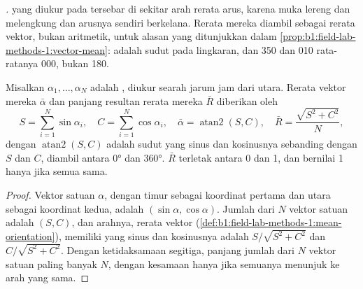 \emph{.}   yang diukur pada  tersebar di sekitar arah rerata arus, karena muka lereng  dan  melengkung dan arusnya sendiri berkelana. Rerata mereka diambil sebagai rerata vektor, bukan aritmetik, untuk alasan yang ditunjukkan dalam \cref{prop:b1:field-lab-methods-1:vector-mean}:  adalah sudut pada lingkaran, dan 350 dan 010 rata-ratanya 000, bukan 180.

\begin{proposition}\label{prop:b1:clastic-sediments:azimuths}
Misalkan $\alpha_1, \ldots, \alpha_N$ adalah , diukur searah jarum jam dari utara. Rerata vektor mereka $\bar\alpha$ dan panjang resultan rerata mereka $\bar R$ diberikan oleh
\[
  S = \sum_{i=1}^N \sin\alpha_i, \quad C = \sum_{i=1}^N \cos\alpha_i, \quad
  \bar\alpha = \operatorname{atan2}(S, C), \quad \bar R = \frac{\sqrt{S^2 + C^2}}{N},
\]
dengan $\operatorname{atan2}(S, C)$ adalah sudut yang sinus dan kosinusnya sebanding dengan $S$ dan $C$, diambil antara \ang{0} dan \ang{360}. $\bar R$ terletak antara 0 dan 1, dan bernilai 1 hanya jika semua  sama.
\end{proposition}

\begin{proof}
Vektor satuan  $\alpha$, dengan timur sebagai koordinat pertama dan utara sebagai koordinat kedua, adalah $(\sin\alpha, \cos\alpha)$. Jumlah dari $N$ vektor satuan adalah
$(S, C)$, dan arahnya, rerata vektor
(\cref{def:b1:field-lab-methods-1:mean-orientation}), memiliki  yang sinus dan kosinusnya adalah $S/\sqrt{S^2+C^2}$ dan $C/\sqrt{S^2+C^2}$. Dengan ketidaksamaan segitiga, panjang jumlah dari $N$ vektor satuan paling banyak $N$, dengan kesamaan hanya jika semuanya menunjuk ke arah yang sama.
\end{proof}

